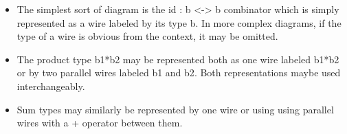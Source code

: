 \documentclass[preprint]{sigplanconf}
\begin{document}
\begin{itemize}
\item The simplest sort of diagram is the {{id : b <-> b}} combinator which
  is simply represented as a wire labeled by its type {{b}}. In more complex
  diagrams, if the type of a wire is obvious from the context, it may be
  omitted.
\begin{center}
\end{center}

\item The product type {{b1*b2}} may be represented both as one wire labeled
  {{b1*b2}} or by two parallel wires labeled {{b1}} and {{b2}}. Both
  representations maybe used interchangeably.
\begin{multicols}{2}
\begin{center}
\end{center}
\begin{center}
\end{center}
\end{multicols}

\item Sum types may similarly be represented by one wire or using using
  parallel wires with a {{+}} operator between them.
\begin{multicols}{2}
\begin{center}
\end{center}
\begin{center}
\end{center}
\end{multicols}


\end{itemize}
\end{document}
